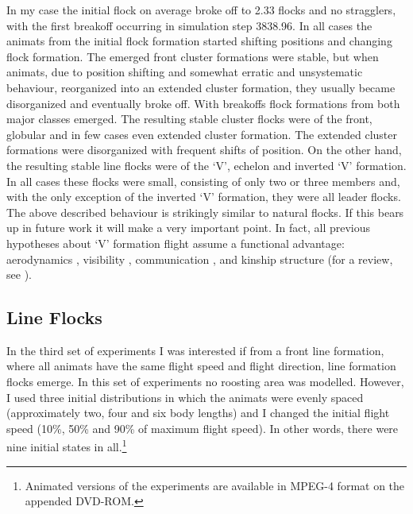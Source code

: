 In my case the initial flock on average broke off to 2.33 flocks and no stragglers, with the first breakoff occurring in simulation step 3838.96. In all cases the animats from the initial flock formation started shifting positions and changing flock formation. The emerged front cluster formations were stable, but when animats, due to position shifting and somewhat erratic and unsystematic behaviour, reorganized into an extended cluster formation, they usually became disorganized and eventually broke off. With breakoffs flock formations from both major classes emerged. The resulting stable cluster flocks were of the front, globular and in few cases even extended cluster formation. The extended cluster formations were disorganized with frequent shifts of position. On the other hand, the resulting stable line flocks were of the `V', echelon and inverted `V' formation. In all cases these flocks were small, consisting of only two or three members and, with the only exception of the inverted `V' formation, they were all leader flocks. The above described behaviour is strikingly similar to natural flocks. If this bears up in future work it will make a very important point. In fact, all previous hypotheses about `V' formation flight assume a functional advantage: aerodynamics \cite{badgerow:1981,badgerow:1988,hainsworth:1987,hainsworth:1989,lissaman:1970}, visibility \cite{heppner:1974a,heppner:1985}, communication \cite{gould:1974,heppner:1974b}, and kinship structure \cite{andersson:2004} (for a review, see \cite{heppner:1997,speakman:1998}). 

\subsection{Line Flocks}
In the third set of experiments I was interested if from a front line formation, where all animats have the same flight speed and flight direction, line formation flocks emerge. In this set of experiments no roosting area was modelled. However, I used three initial distributions in which the animats were evenly spaced (approximately two, four and six body lengths) and I changed the initial flight speed (10\%, 50\% and 90\% of maximum flight speed). In other words, there were nine initial states in all.\footnote{Animated versions of the experiments are available in MPEG-4 format on the appended DVD-ROM.}

